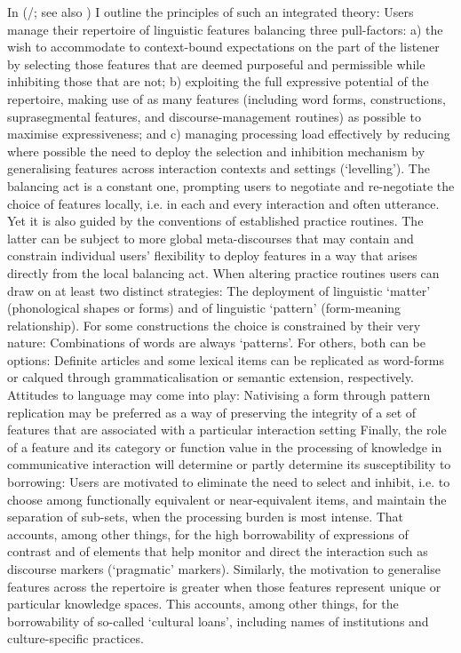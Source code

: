 \documentclass[output=paper]{langscibook}
\begin{document}
In \citeauthor{matras_language_2009} (\citeyear{matras_language_2009}/\citeyear{matras_language_2020}; see also \citealt{matras_theorizing_2021a}) I outline the principles of such an integrated theory: Users manage their repertoire of linguistic features balancing three pull-factors: a) the wish to accommodate to context-bound expectations on the part of the listener by selecting those features that are deemed purposeful and permissible while inhibiting those that are not; b) exploiting the full expressive potential of the repertoire, making use of as many features (including word forms, constructions, suprasegmental features, and discourse-management routines) as possible to maximise expressiveness; and c) managing processing load effectively by reducing where possible the need to deploy the selection and inhibition mechanism by generalising features across interaction contexts and settings (‘levelling’). The balancing act is a constant one, prompting users to negotiate and re-negotiate the choice of features locally, i.e. in each and every interaction and often utterance. Yet it is also guided by the conventions of established practice routines. The latter can be subject to more global meta-discourses that may contain and constrain individual users’ flexibility to deploy features in a way that arises directly from the local balancing act. When altering practice routines users can draw on at least two distinct strategies: The deployment of linguistic ‘matter’ (phonological shapes or forms) and of linguistic ‘pattern’ (form-meaning relationship). For some constructions the choice is constrained by their very nature: Combinations of words are always ‘patterns’. For others, both can be options: Definite articles and some lexical items can be replicated as word-forms or calqued through grammaticalisation or semantic extension, respectively. Attitudes to language may come into play: Nativising a form through pattern replication may be preferred as a way of preserving the integrity of a set of features that are associated with a particular interaction setting Finally, the role of a feature and its category or function value in the processing of knowledge in communicative interaction will determine or partly determine its susceptibility to borrowing: Users are motivated to eliminate the need to select and inhibit, i.e. to choose among functionally equivalent or near-equivalent items, and maintain the separation of sub-sets, when the processing burden is most intense. That accounts, among other things, for the high borrowability of expressions of contrast and of elements that help monitor and direct the interaction such as discourse markers (‘pragmatic’ markers). Similarly, the motivation to generalise features across the repertoire is greater when those features represent unique or particular knowledge spaces. This accounts, among other things, for the borrowability of so-called ‘cultural loans’, including names of institutions and culture-specific practices.
\end{document}
